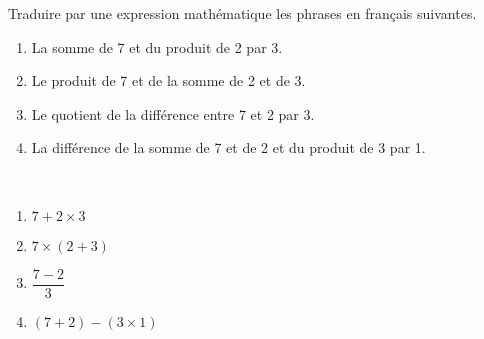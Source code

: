 \begin{exercice}%
    Traduire par une expression mathématique les phrases en français suivantes.
    \begin{enumerate}
       \item La somme de 7 et du produit de 2 par 3.
       \item Le produit de 7 et de la somme de 2 et de 3.
       \item Le quotient de la différence entre 7 et 2 par 3.
       \item La différence de la somme de 7 et de 2 et du produit de 3 par 1.
    \end{enumerate}

 \end{exercice}
 
 \begin{corrige}
    \ \\ [-5mm]
    \begin{enumerate}
       \item \blue $7+2\times3$
       \item \blue $7\times(2+3)$ \smallskip
       \item \blue $\dfrac{7-2}{3}$ \medskip
       \item \blue $(7+2)-(3\times1)$
    \end{enumerate}
 \end{corrige}